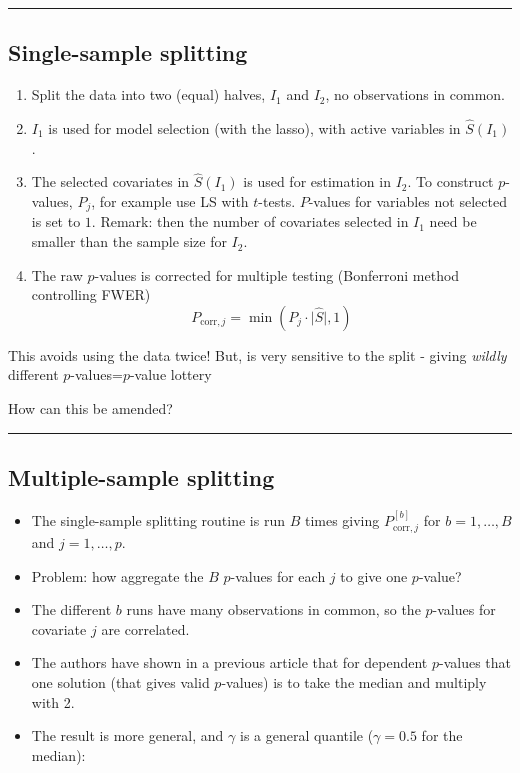 \documentclass[
  letterpaper,
  DIV=11,
  numbers=noendperiod]{scrartcl}
\providecommand{\tightlist}{%
  \setlength{\itemsep}{0pt}\setlength{\parskip}{0pt}}\usepackage{longtable,booktabs,array}
\begin{document}
\begin{center}\rule{0.5\linewidth}{0.5pt}\end{center}

\hypertarget{single-sample-splitting}{%
\subsection{Single-sample splitting}\label{single-sample-splitting}}

\begin{enumerate}
\def\labelenumi{\arabic{enumi})}
\tightlist
\item
  Split the data into two (equal) halves, \(I_1\) and \(I_2\), no
  observations in common.
\item
  \(I_1\) is used for model selection (with the lasso), with active
  variables in \(\hat{S}(I_1)\).
\item
  The selected covariates in \(\hat{S}(I_1)\) is used for estimation in
  \(I_2\). To construct \(p\)-values, \(P_j\), for example use LS with
  \(t\)-tests. \(P\)-values for variables not selected is set to \(1\).
  Remark: then the number of covariates selected in \(I_1\) need be
  smaller than the sample size for \(I_2\).
\item
  The raw \(p\)-values is corrected for multiple testing (Bonferroni
  method controlling FWER)
  \[ P_{\text{corr},j}=\min(P_j \cdot \lvert \hat{S} \rvert,1)\]
\end{enumerate}

This avoids using the data twice! But, is very sensitive to the split -
giving \emph{wildly} different \(p\)-values=\(p\)-value lottery

How can this be amended?

\begin{center}\rule{0.5\linewidth}{0.5pt}\end{center}

\hypertarget{multiple-sample-splitting}{%
\subsection{Multiple-sample splitting}\label{multiple-sample-splitting}}

\begin{itemize}
\item
  The single-sample splitting routine is run \(B\) times giving
  \(P_{\text{corr},j}^{[b]}\) for \(b=1,\ldots,B\) and \(j=1,\ldots,p\).
\item
  Problem: how aggregate the \(B\) \(p\)-values for each \(j\) to give
  one \(p\)-value?
\item
  The different \(b\) runs have many observations in common, so the
  \(p\)-values for covariate \(j\) are correlated.
\item
  The authors have shown in a previous article that for dependent
  \(p\)-values that one solution (that gives valid \(p\)-values) is to
  take the median and multiply with 2.
\item
  The result is more general, and \(\gamma\) is a general quantile
  (\(\gamma=0.5\) for the median):
\end{itemize}
\end{document}
